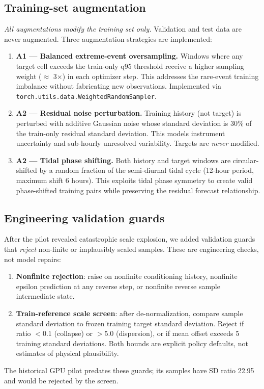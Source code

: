 \subsection{Training-set augmentation}
\emph{All augmentations modify the training set only.} Validation and test data
are never augmented. Three augmentation strategies are implemented:

\begin{enumerate}
    \item \textbf{A1 — Balanced extreme-event oversampling.} Windows where any target
    cell exceeds the train-only q95 threshold receive a higher sampling weight
    ($\approx$ 3$\times$) in each optimizer step. This addresses the rare-event
    training imbalance without fabricating new observations. Implemented via
    \texttt{torch.utils.data.WeightedRandomSampler}.

    \item \textbf{A2 — Residual noise perturbation.} Training history (not target)
    is perturbed with additive Gaussian noise whose standard deviation is 30\% of
    the train-only residual standard deviation. This models instrument uncertainty
    and sub-hourly unresolved variability. Targets are \emph{never} modified.

    \item \textbf{A2 — Tidal phase shifting.} Both history and target windows are
    circular-shifted by a random fraction of the semi-diurnal tidal cycle
    (12-hour period, maximum shift 6 hours). This exploits tidal phase symmetry
    to create valid phase-shifted training pairs while preserving the residual
    forecast relationship.
\end{enumerate}

\subsection{Engineering validation guards}
After the pilot revealed catastrophic scale explosion, we added validation guards
that \emph{reject} non-finite or implausibly scaled samples. These are engineering
checks, not model repairs:

\begin{enumerate}
    \item \textbf{Nonfinite rejection}: raise on nonfinite conditioning history,
    nonfinite epsilon prediction at any reverse step, or nonfinite reverse sample
    intermediate state.

    \item \textbf{Train-reference scale screen}: after de-normalization, compare
    sample standard deviation to frozen training target standard deviation. Reject
    if ratio $< 0.1$ (collapse) or $> 5.0$ (dispersion), or if mean offset exceeds
    5 training standard deviations. Both bounds are explicit policy defaults, not
    estimates of physical plausibility.
\end{enumerate}

The historical GPU pilot predates these guards; its samples have SD ratio 22.95
and would be rejected by the screen.
